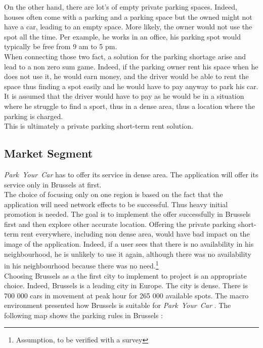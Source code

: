 \documentclass[12pt,a4paper,oneside]{book}
\newcommand{\bp}{\textit{Park~Your~Car }}
\begin{document}
On the other hand, there are lot's of empty private parking spaces. Indeed, houses often come with a parking and a parking space but the owned might not have a car, leading to an empty space. More likely, the owner would not use the spot all the time. Per example, he works in an office, his parking spot would typically be free from 9 am to 5 pm.\\

When connecting those two fact, a solution for the parking shortage arise and lead to a non zero sum game. Indeed, if the parking owner rent his space when he does not use it, he would earn money, and the driver would be able to rent the space thus finding a spot easily and he would have to pay anyway to park his car. It is assumed that the driver would have to pay as he would be in a situation where he struggle to find a sport, thus in a dense area, thus a location where the parking is charged.\\

This is ultimately a private parking short-term rent solution.

\subsection{Market Segment}
\bp has to offer its service in dense area. The application will offer its service only in Brussels at first.\\

The choice of focusing only on one region is based on the fact that the application will need network effects to be successful. Thus heavy initial promotion is needed. The goal is to implement the offer successfully in Brussels first and then explore other accurate location. Offering the private parking short-term rent everywhere, including non dense area, would have bad impact on the image of the application. Indeed, if a user sees that there is no availability in his neighbourhood, he is unlikely to use it again, although there was no availability in his neighbourhood because there was no need.\footnote{Assumption, to be verified with a survey} \\

Choosing Brussels as a the first city to implement to project is an appropriate choice. Indeed, Brussels is a leading city in Europe. The city is dense. There is 700 000 cars in movement at peak hour for 265 000 available spots.\cite{parkbx} The macro environment presented how Brussels is suitable for \bp. The following map shows the parking rules in Brussels\cite{parkbx} : \\
\end{document}
